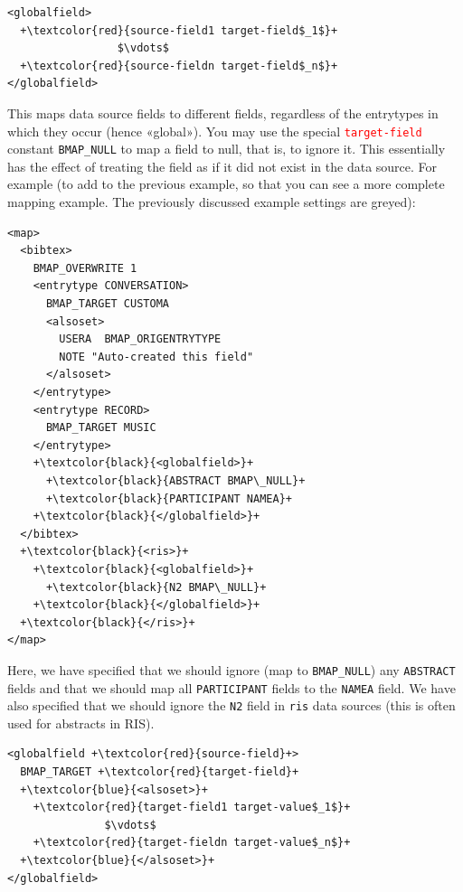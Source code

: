 \documentclass{ltxdockit}
\begin{document}
\lstset{showspaces=false}
\begin{lstlisting}[escapechar=+,mathescape=true]
<globalfield>
  +\textcolor{red}{source-field1 target-field$_1$}+
                 $\vdots$
  +\textcolor{red}{source-fieldn target-field$_n$}+
</globalfield>
\end{lstlisting}

\noindent This maps data source fields to different fields,
regardless of the entrytypes in which they occur (hence «global»). You may
use the special \textcolor{red}{\texttt{target-field}} constant \verb+BMAP_NULL+
to map a field to null, that is, to ignore it. This essentially has the
effect of treating the field as if it did not exist in the data source. For
example (to add to the previous example, so that you can see a more
complete mapping example. The previously discussed example settings are greyed):

{\color{grey}
\lstset{showspaces=false}
\begin{lstlisting}[escapechar=+,mathescape=true]
<map>
  <bibtex>
    BMAP_OVERWRITE 1
    <entrytype CONVERSATION>
      BMAP_TARGET CUSTOMA
      <alsoset>
        USERA  BMAP_ORIGENTRYTYPE
        NOTE "Auto-created this field"
      </alsoset>
    </entrytype>
    <entrytype RECORD>
      BMAP_TARGET MUSIC
    </entrytype>
    +\textcolor{black}{<globalfield>}+
      +\textcolor{black}{ABSTRACT BMAP\_NULL}+
      +\textcolor{black}{PARTICIPANT NAMEA}+
    +\textcolor{black}{</globalfield>}+
  </bibtex>
  +\textcolor{black}{<ris>}+
    +\textcolor{black}{<globalfield>}+
      +\textcolor{black}{N2 BMAP\_NULL}+
    +\textcolor{black}{</globalfield>}+
  +\textcolor{black}{</ris>}+
</map>
\end{lstlisting}
}

\noindent Here, we have specified that we should ignore (map to
\verb+BMAP_NULL+) any \verb+ABSTRACT+ fields and that we should map all
\verb+PARTICIPANT+ fields to the \verb+NAMEA+ field. We have also specified
that we should ignore the \verb+N2+ field in \verb+ris+ data sources (this
is often used for abstracts in RIS).
\bigskip
{}

\lstset{showspaces=false}
\begin{lstlisting}[escapechar=+,mathescape=true]
<globalfield +\textcolor{red}{source-field}+>
  BMAP_TARGET +\textcolor{red}{target-field}+
  +\textcolor{blue}{<alsoset>}+
    +\textcolor{red}{target-field1 target-value$_1$}+
               $\vdots$
    +\textcolor{red}{target-fieldn target-value$_n$}+
  +\textcolor{blue}{</alsoset>}+
</globalfield>
\end{lstlisting}
\end{document}
